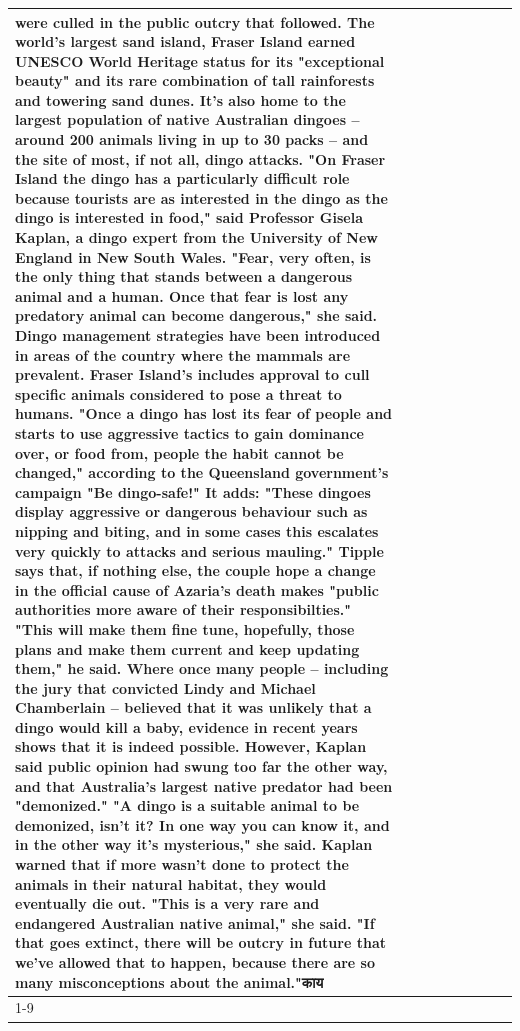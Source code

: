 \begin{table}[H]
\begin{tabular}{lllrlllll}
were culled in the public outcry that followed. The world's largest sand island, Fraser Island earned UNESCO World Heritage status for its "exceptional beauty" and its rare combination of tall rainforests and towering sand dunes. It's also home to the largest population of native Australian dingoes -- around 200 animals living in up to 30 packs -- and the site of most, if not all, dingo attacks. "On Fraser Island the dingo has a particularly difficult role because tourists are as interested in the dingo as the dingo is interested in food," said Professor Gisela Kaplan, a dingo expert from the University of New England in New South Wales. "Fear, very often, is the only thing that stands between a dangerous animal and a human. Once that fear is lost any predatory animal can become dangerous," she said. Dingo management strategies have been introduced in areas of the country where the mammals are prevalent. Fraser Island's includes approval to cull specific animals considered to pose a threat to humans. "Once a dingo has lost its fear of people and starts to use aggressive tactics to gain dominance over, or food from, people the habit cannot be changed," according to the Queensland government's campaign "Be dingo-safe!" It adds: "These dingoes display aggressive or dangerous behaviour such as nipping and biting, and in some cases this escalates very quickly to attacks and serious mauling." Tipple says that, if nothing else, the couple hope a change in the official cause of Azaria's death makes "public authorities more aware of their responsibilties." "This will make them fine tune, hopefully, those plans and make them current and keep updating them," he said. Where once many people -- including the jury that convicted Lindy and Michael Chamberlain -- believed that it was unlikely that a dingo would kill a baby, evidence in recent years shows that it is indeed possible. However, Kaplan said public opinion had swung too far the other way, and that Australia's largest native predator had been "demonized." "A dingo is a suitable animal to be demonized, isn't it? In one way you can know it, and in the other way it's mysterious," she said. Kaplan warned that if more wasn't done to protect the animals in their natural habitat, they would eventually die out. "This is a very rare and endangered Australian native animal," she said. "If that goes extinct, there will be outcry in future that we've allowed that to happen, because there are so many misconceptions about the animal."काय \\
\cline{1-9}
\bottomrule
\end{tabular}
\end{table}

